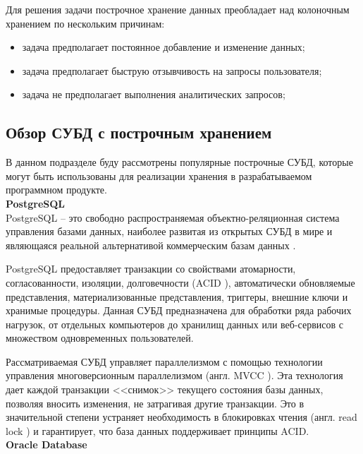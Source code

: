 Для решения задачи построчное хранение данных преобладает над колоночным хранением по нескольким причинам:

\begin{itemize}
	\item задача предполагает постоянное добавление и изменение данных;
	\item задача предполагает быструю отзывчивость на запросы пользователя;
	\item задача не предполагает выполнения аналитических запросов;
\end{itemize}

\subsection{Обзор СУБД с построчным хранением}

В данном подразделе буду рассмотрены популярные построчные СУБД, которые могут быть использованы для реализации хранения в разрабатываемом программном продукте.\\

\noindent\textbf{PostgreSQL}\\

PostgreSQL \cite{postgresql} -- это свободно распространяемая объектно-реляционная система управления базами данных, наиболее развитая из открытых СУБД в мире и являющаяся реальной альтернативой коммерческим базам данных \cite{postgresql-fact}.

PostgreSQL предоставляет транзакции со свойствами атомарности, согласованности, изоляции, долговечности (ACID \cite{acid}), автоматически обновляемые представления, материализованные представления, триггеры, внешние ключи и хранимые процедуры. Данная СУБД предназначена для обработки ряда рабочих нагрузок, от отдельных компьютеров до хранилищ данных или веб-сервисов с множеством одновременных пользователей. 

Рассматриваемая СУБД управляет параллелизмом с помощью технологии управления многоверсионным параллелизмом (англ. MVCC \cite{mvcc}). Эта технология дает каждой транзакции <<снимок>> текущего состояния базы данных, позволяя вносить изменения, не затрагивая другие транзакции. Это в значительной степени устраняет необходимость в блокировках чтения (англ. read lock \cite{r-lock}) и гарантирует, что база данных поддерживает принципы ACID. \\

\noindent\textbf{Oracle Database}\\

